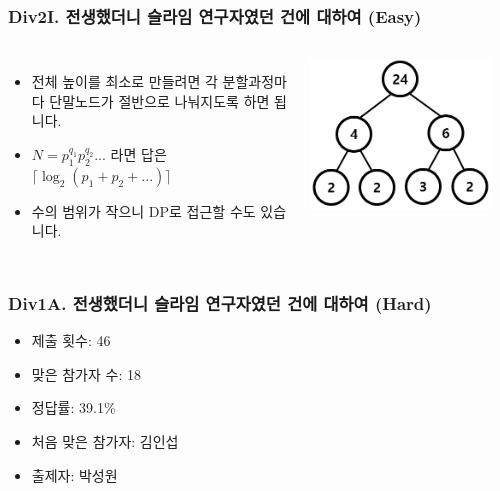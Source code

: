 \documentclass[xetex]{beamer}
\begin{document}
\begin{frame}
  \frametitle{Div2I. 전생했더니 슬라임 연구자였던 건에 대하여 (Easy)}
  \begin{columns}
      \begin{itemize}
        \item 전체 높이를 최소로 만들려면 각 분할과정마다 단말노드가 절반으로 나눠지도록 하면 됩니다.
        \item $N = p_1^{q_1} p_2^{q_2} ...$ 라면 답은 $\lceil \log_2(p_1 + p_2 + ...) \rceil$
        \item 수의 범위가 작으니 DP로 접근할 수도 있습니다.
      \end{itemize}
      \includegraphics[width=0.9\textwidth]{slime-sol-1.png}
  \end{columns}
\end{frame}

\begin{frame}
  \frametitle{Div1A. 전생했더니 슬라임 연구자였던 건에 대하여 (Hard)}
  \begin{itemize}
    \item 제출 횟수: 46
    \item 맞은 참가자 수: 18
    \item 정답률: 39.1\%
    \item 처음 맞은 참가자: 김인섭
    \item 출제자: 박성원
  \end{itemize}
\end{frame}
\end{document}
